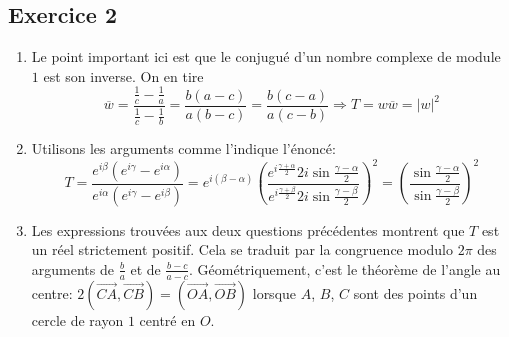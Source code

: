 \subsection*{Exercice 2}
\begin{enumerate}
 \item Le point important ici est que le conjugué d'un nombre complexe de module $1$ est son inverse. On en tire
\begin{displaymath}
 \overline{w} = \frac{\frac{1}{c}-\frac{1}{a}}{\frac{1}{c}-\frac{1}{b}}
=\frac{b(a-c)}{a(b-c)}=\frac{b(c-a)}{a(c-b)}
\Rightarrow T = w\overline{w} = |w|^2
\end{displaymath}

 \item Utilisons les arguments comme l'indique l'énoncé:
\begin{displaymath}
 T = \frac{e^{i\beta}(e^{i\gamma} - e^{i\alpha})}{e^{i\alpha}(e^{i\gamma} - e^{i\beta})}
= e^{i(\beta - \alpha)}
\left( 
  \frac
    {e^{i\frac{\gamma + \alpha}{2}}2i\sin\frac{\gamma - \alpha}{2}}
    {e^{i\frac{\gamma + \beta}{2}}2i\sin\frac{\gamma - \beta}{2}}
\right)^2 
=
\left( 
  \frac
    {\sin\frac{\gamma - \alpha}{2}}
    {\sin\frac{\gamma - \beta}{2}}
\right)^2 
\end{displaymath}

 \item Les expressions trouvées aux deux questions précédentes montrent que $T$ est un réel strictement positif. Cela se traduit par la congruence modulo $2\pi$ des arguments de $\frac{b}{a}$ et de $\frac{b-c}{a-c}$. Géométriquement, c'est le théorème de l'angle au centre:
$2(\overrightarrow{CA},\overrightarrow{CB})= (\overrightarrow{OA},\overrightarrow{OB})$ lorsque $A$, $B$, $C$ sont des points d'un cercle de rayon $1$ centré en $O$. 
\end{enumerate}

